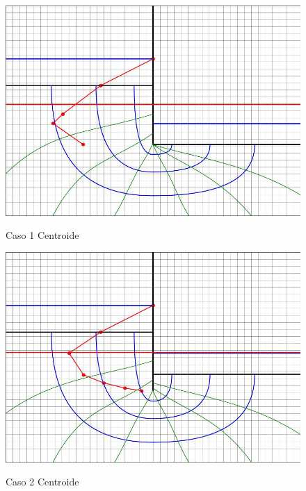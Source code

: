 \begin{figure}[H]
    \centering
    \begin{minipage}{0.32\textwidth}
        \centering
        \includegraphics[width=\textwidth]{GRAFICOS/caso_1_centroide_y.jpg}
        \caption{Caso 1 Centroide}
        \label{fig:caso_1_centroide_y}
    \end{minipage}
    \begin{minipage}{0.32\textwidth}
        \centering
        \includegraphics[width=\textwidth]{GRAFICOS/caso_2_centroide_y.jpg}
        \caption{Caso 2 Centroide}
        \label{fig:caso_2_centroide_y}
    \end{minipage}
    \begin{minipage}{0.32\textwidth}

\end{minipage}
\end{figure}

